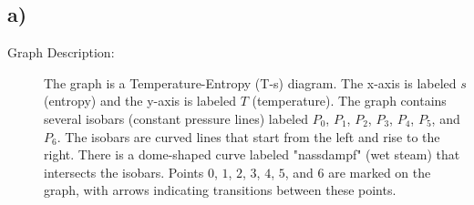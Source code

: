 

\subsection*{a)}

\begin{description}
    \item[Graph Description:] The graph is a Temperature-Entropy (T-s) diagram. The x-axis is labeled $s$ (entropy) and the y-axis is labeled $T$ (temperature). The graph contains several isobars (constant pressure lines) labeled $P_0$, $P_1$, $P_2$, $P_3$, $P_4$, $P_5$, and $P_6$. The isobars are curved lines that start from the left and rise to the right. There is a dome-shaped curve labeled "nassdampf" (wet steam) that intersects the isobars. Points $0$, $1$, $2$, $3$, $4$, $5$, and $6$ are marked on the graph, with arrows indicating transitions between these points.
\end{description}